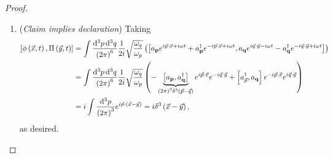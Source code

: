 \begin{proof}
    \begin{enumerate}[label=\arabic*)]
        \item (\textit{Claim implies declaration}) Taking
            \begin{align}
                \left[ \phi \left( \vec{x},t \right) , \Pi \left( \vec{y},t \right)  \right] &= \int \frac{\dd{^3p} \dd{^3q}}{\left( 2\pi \right)^{6}} \frac{1}{2i} \sqrt{\frac{\omega_q}{\omega_p}}\left(  \left[ a_{\vb{p}} e^{i \vec{p} \cdot \vec{x} + i \omega t} + a^{\dag}_{\vb{p}} e^{-i \vec{p} \cdot \vec{x} + i \omega t}, a_{\vb{q}} e^{i \vec{q} \cdot \vec{y} - i \omega t} - a^{\dag}_{\vb{q}} e^{-i \vec{q} \cdot \vec{y} + i \omega t}  \right]  \right) \\
&= \int \frac{\dd{^3p} \dd{^3q}}{\left( 2\pi \right)^{6}} \frac{1}{2i} \sqrt{\frac{\omega_q}{\omega_p}} \left( - \underbrace{\left[ a_{\vb{p}}, a^{\dag}_{\vb{q}} \right]}_{\left( 2\pi \right)^3 \delta^{3}\left( \vec{p} - \vec{q} \right) } e^{i \vec{p} \cdot \vec{x}} e^{-i \vec{q} \cdot \vec{y}} + \left[ a^{\dag}_{\vec{p}}, a_{\vb{q}} \right] e^{-i \vec{p} \cdot \vec{x}} e^{i \vec{q} \cdot \vec{y}}  \right) \\
&= i\int \frac{\dd{^3p}}{\left( 2\pi \right)^{3}} e^{i \vec{p} \cdot \left( \vec{x} - \vec{y} \right) } = i \delta^{3}\left( \vec{x} - \vec{y} \right)
            ,\end{align}
            as desired.
    \end{enumerate}
\end{proof}


